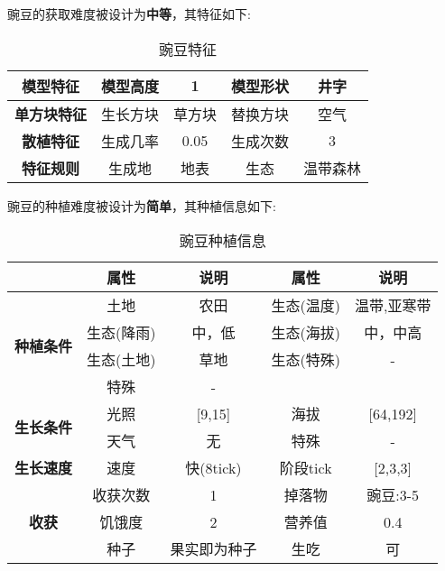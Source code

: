 豌豆的获取难度被设计为\textbf{中等}，其特征如下:
\begin{table}[H]
    \centering
    \caption{豌豆特征}
    \label{table:豌豆特征}
    \setlength{\tabcolsep}{4mm}
    \begin{tabular}{c|cc|cc}
        \toprule
        \textbf{模型特征}   & 模型高度 & 1      & 模型形状 & 井字     \\
        \midrule
        \textbf{单方块特征} & 生长方块 & 草方块 & 替换方块 & 空气     \\
        \midrule
        \textbf{散植特征}   & 生成几率 & 0.05   & 生成次数 & 3        \\
        \midrule
        \textbf{特征规则}   & 生成地   & 地表   & 生态     & 温带森林 \\
        \bottomrule
    \end{tabular}
\end{table}


豌豆的种植难度被设计为\textbf{简单}，其种植信息如下:

\begin{table}[H]
    \centering
    \caption{豌豆种植信息}
    \label{table:豌豆种植信息}
    \setlength{\tabcolsep}{4mm}
    \begin{tabular}{c|cc|cc}
        \toprule
                                           & \textbf{属性} & \textbf{说明} & \textbf{属性} & \textbf{说明} \\
        \midrule
        \multirow{4}{*}{\textbf{种植条件}} & 土地          & 农田          & 生态(温度)    & 温带,亚寒带    \\
                                           & 生态(降雨)    & 中，低        & 生态(海拔)    & 中，中高            \\
                                           & 生态(土地)    & 草地          & 生态(特殊)    & -             \\
                                           & 特殊          & -                                             \\
        \midrule
        \multirow{2}{*}{\textbf{生长条件}} & 光照          & [9,15]        & 海拔          & [64,192]      \\
                                           & 天气          & 无            & 特殊          & -             \\
        \midrule
        \textbf{生长速度}                  & 速度          & 快(8tick)     & 阶段tick      & [2,3,3]       \\
        \midrule
        \multirow{3}{*}{\textbf{收获}}     & 收获次数      & 1             & 掉落物        & 豌豆:3-5      \\
                                           & 饥饿度        & 2             & 营养值        & 0.4           \\
                                           & 种子          & 果实即为种子  & 生吃          & 可   \\
        \bottomrule
    \end{tabular}
\end{table}

